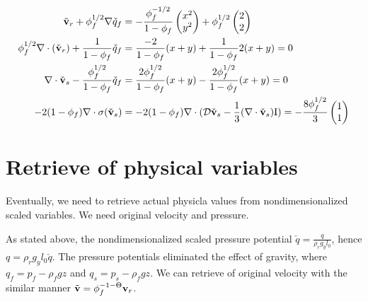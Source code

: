 \begin{equation}
\begin{aligned}
\tilde{\bold{v}}_r + \phi_f^{1/2}\nabla\check{q}_f &= 
-\frac{\phi_f^{-1/2}}{1-\phi_f}\begin{pmatrix}x^2 \\ y^2 \end{pmatrix} + \phi_f^{1/2}\begin{pmatrix} 2 \\ 2 \end{pmatrix}\\
\phi_f^{1/2}\nabla \cdot (\check{\bold{v}}_r) + \frac{1}{1-\phi_f}\check{q}_f  &= \frac{-2}{1-\phi_f}(x+y) + \frac{1}{1-\phi_f}2(x+y)=0\\
\nabla \cdot \check{\bold{v}}_s - \frac{\phi_f^{1/2}}{1-\phi_f}\check{q}_f &= \frac{2\phi_f^{1/2}}{1-\phi_f}(x+y) - \frac{2\phi_f^{1/2}}{1-\phi_f}(x+y) = 0\\
-2(1-\phi_f)\nabla \cdot \sigma(\check{\bold{v}}_s) &= -2(1-\phi_f)\nabla \cdot (\mathcal{D}\check{\bold{v}}_s - \frac{1}{3}(\nabla \cdot \check{\bold{v}}_s) \bold{\text{I}}) = 
-\frac{8\phi_f^{1/2}}{3} \begin{pmatrix} 1 \\ 1 \end{pmatrix}
\end{aligned}
\end{equation}

\section{Retrieve of physical variables}
Eventually, we need to retrieve actual physicla values from nondimensionalized scaled variables.
We need original velocity and pressure.

As stated above, the nondimensionalized scaled pressure potential $\check{q} =\frac{q}{\rho_r g_y l_0}$, hence
$q = \rho_r g_y l_0 \check{q}$. The pressure potentials eliminated the effect of gravity, where $q_f = p_f - \rho_f gz$ and 
$q_s = p_s - \rho_f g z$. We can retrieve of original velocity with the similar manner $\tilde{\bold{v}} = \phi_f^{-1-\Theta} \bold{v}_r$.

%
%

%
